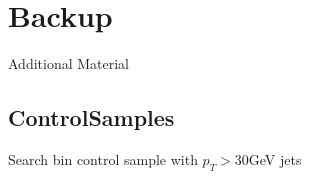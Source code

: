 \documentclass{beamer}
\begin{document}
\section{Backup}
\begin{frame}
  \begin{center}
    {\Large Additional Material}
  \end{center}
\end{frame}


\subsection{ControlSamples}

\begin{frame}
  \begin{center}
    {\Large Search bin control sample \HT \NJets with $p_{T}>30$GeV jets}
  \end{center}
\end{frame}
\end{document}
